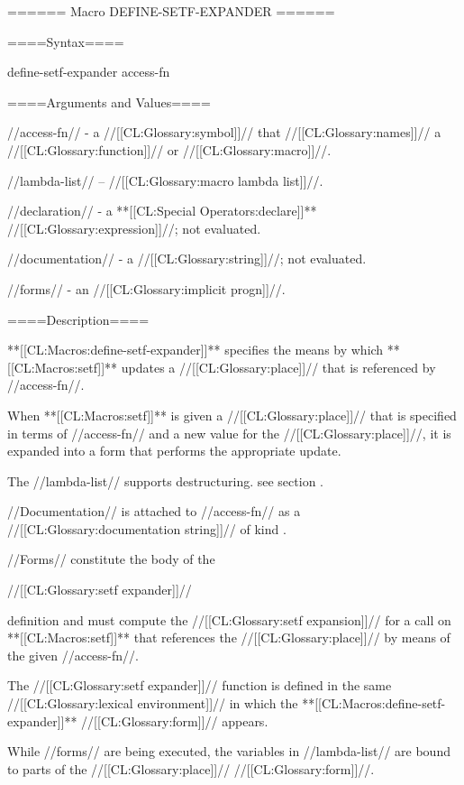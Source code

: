 ====== Macro DEFINE-SETF-EXPANDER ======

====Syntax====

\DefmacWithValuesNewline define-setf-expander {} {access-fn}

====Arguments and Values====

//access-fn// - a //[[CL:Glossary:symbol]]// that //[[CL:Glossary:names]]// a //[[CL:Glossary:function]]// or //[[CL:Glossary:macro]]//.

//lambda-list// -- //[[CL:Glossary:macro lambda list]]//.

//declaration// - a **[[CL:Special Operators:declare]]** //[[CL:Glossary:expression]]//; not evaluated.

//documentation// - a //[[CL:Glossary:string]]//; not evaluated.

//forms// - an //[[CL:Glossary:implicit progn]]//.

====Description====

**[[CL:Macros:define-setf-expander]]** specifies the means by which **[[CL:Macros:setf]]** updates a //[[CL:Glossary:place]]// that is referenced by //access-fn//.

When **[[CL:Macros:setf]]** is given a //[[CL:Glossary:place]]// that is specified in terms of //access-fn// and a new value for the //[[CL:Glossary:place]]//, it is expanded into a form that performs the appropriate update.

The //lambda-list// supports destructuring. see section {\secref\MacroLambdaLists}.

//Documentation// is attached to //access-fn// as a //[[CL:Glossary:documentation string]]// of kind .

//Forms// constitute the body of the

//[[CL:Glossary:setf expander]]//

definition and must compute the //[[CL:Glossary:setf expansion]]// for a call on **[[CL:Macros:setf]]** that references the //[[CL:Glossary:place]]// by means of the given //access-fn//.

The //[[CL:Glossary:setf expander]]// function is defined in the same //[[CL:Glossary:lexical environment]]// in which the **[[CL:Macros:define-setf-expander]]** //[[CL:Glossary:form]]// appears.

While //forms// are being executed, the variables in //lambda-list// are bound to parts of the //[[CL:Glossary:place]]// //[[CL:Glossary:form]]//.

